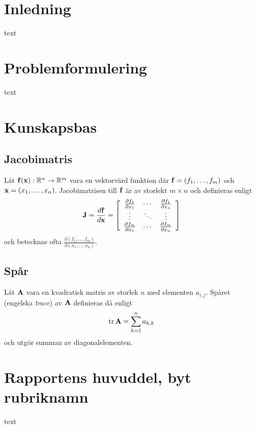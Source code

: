 \documentclass[11pt]{article}
\newcommand{\bfr}[1]{\textbf{\textrm{{#1}}}}
\begin{document}
\begin{flushleft}

\section{Inledning}
text \cite{893287}

\section{Problemformulering}
text

\pagebreak
\section{Kunskapsbas}
\subsection{Jacobimatris}
Låt $\bfr{f}(\bfr{x}):\mathbb{R}^{n}\rightarrow\mathbb{R}^{m}$ vara en vektorvärd funktion där $\bfr{f}=\left(f_1,\ldots,f_m\right)$ och $\bfr{x}=\left(x_1,\ldots,x_n\right)$. Jacobimatrisen till $\bfr{f}$ är av storlekt $m\times n$ och definieras enligt
\begin{equation*}
	\bfr{J} = \frac{d\bfr{f}}{d\bfr{x}} = \left[ \begin{array}{ccc}
		\frac{\partial f_1}{\partial x_1} & \cdots & \frac{\partial f_1}{\partial x_n} \\
		\vdots & \ddots & \vdots \\
		\frac{\partial f_m}{\partial x_1} & \cdots & \frac{\partial f_m}{\partial x_n}
	\end{array} \right]
\end{equation*}
och betecknas ofta $\frac{\partial \left(f_1,\ldots,f_m\right)}{\partial \left(x_1,\ldots,x_n \right)}$.

\subsection{Spår}
Låt $\bfr{A}$ vara en kvadratisk matris av storlek $n$ med elementen $a_{i,j}$. Spåret (engelska \emph{trace}) av $\bfr{A}$ definieras då enligt
\begin{equation*}
	\mathrm{tr}\,\bfr{A} = \sum_{k=1}^{n} a_{k,k}
\end{equation*}
och utgör summan av diagonalelementen.

\pagebreak
\section{Rapportens huvuddel, byt rubriknamn}
text


\end{flushleft}
\end{document}
